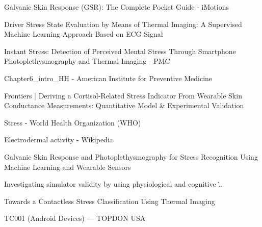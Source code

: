 Galvanic Skin Response (GSR): The Complete Pocket Guide - iMotions


Driver Stress State Evaluation by Means of Thermal Imaging: A Supervised
Machine Learning Approach Based on ECG Signal


Instant Stress: Detection of Perceived Mental Stress Through Smartphone
Photoplethysmography and Thermal Imaging - PMC


Chapter6\_intro\_HH - American Institute for Preventive Medicine


Frontiers | Deriving a Cortisol-Related Stress Indicator From Wearable
Skin Conductance Measurements: Quantitative Model \& Experimental
Validation


Stress - World Health Organization (WHO)


Electrodermal activity - Wikipedia


Galvanic Skin Response and Photoplethysmography for Stress Recognition
Using Machine Learning and Wearable Sensors


Investigating simulator validity by using physiological and cognitive
\...


Towards a Contactless Stress Classification Using Thermal Imaging


TC001 (Android Devices) --- TOPDON USA
